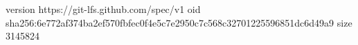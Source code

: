 version https://git-lfs.github.com/spec/v1
oid sha256:6e772af374ba2ef570fbfec0f4e5c7e2950c7c568c32701225596851dc6d49a9
size 3145824
